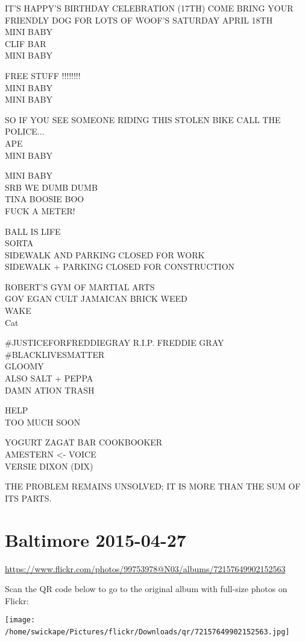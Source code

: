 \documentclass[10pt,letterpaper]{article}
\begin{document}
IT'S HAPPY'S BIRTHDAY CELEBRATION (17TH) COME BRING YOUR FRIENDLY DOG FOR LOTS OF WOOF'S SATURDAY APRIL 18TH\\
MINI BABY\\
CLIF BAR\\
MINI BABY

FREE STUFF !!!!!!!!\\
MINI BABY\\
MINI BABY

SO IF YOU SEE SOMEONE RIDING THIS STOLEN BIKE CALL THE POLICE...\\
APE\\
MINI BABY

MINI BABY\\
SRB WE DUMB DUMB\\
TINA BOOSIE BOO\\
FUCK A METER!

BALL IS LIFE\\
SORTA\\
SIDEWALK AND PARKING CLOSED FOR WORK\\
SIDEWALK + PARKING CLOSED FOR CONSTRUCTION

ROBERT'S GYM OF MARTIAL ARTS\\
GOV EGAN CULT JAMAICAN BRICK WEED\\
WAKE\\
Cat

\#JUSTICEFORFREDDIEGRAY R.I.P. FREDDIE GRAY \#BLACKLIVESMATTER\\
GLOOMY\\
ALSO SALT + PEPPA\\
DAMN ATION TRASH

HELP\\
TOO MUCH SOON

YOGURT ZAGAT BAR COOKBOOKER\\
AMESTERN <{-} VOICE\\
VERSIE DIXON (DIX)

THE PROBLEM REMAINS UNSOLVED; IT IS MORE THAN THE SUM OF ITS PARTS.
\

\section*{Baltimore 2015-04-27}

\url{https://www.flickr.com/photos/99753978@N03/albums/72157649902152563}

Scan the QR code below to go to the original album with full-size photos on Flickr:

\texttt{[image: /home/swickape/Pictures/flickr/Downloads/qr/72157649902152563.jpg]}
\
\end{document}
